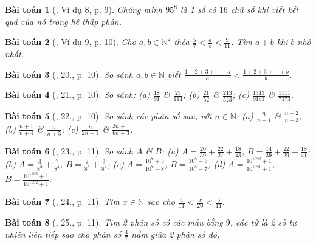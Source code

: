 \documentclass{article}
\newtheorem{baitoan}{Bài toán}
\begin{document}
\begin{baitoan}[\cite{Binh_Toan_6_tap_2}, Ví dụ 8, p. 9]
	Chứng minh $95^8$ là 1 số có $16$ chữ số khi viết kết quả của nó trong hệ thập phân.
\end{baitoan}

\begin{baitoan}[\cite{Binh_Toan_6_tap_2}, Ví dụ 9, p. 10]
	Cho $a,b\in\mathbb{N}^\star$ thỏa $\frac{5}{7} < \frac{a}{b} < \frac{9}{11}$. Tìm $a + b$ khi $b$ nhỏ nhất.
\end{baitoan}

\begin{baitoan}[\cite{Binh_Toan_6_tap_2}, 20., p. 10]
	So sánh $a,b\in\mathbb{N}$ biết $\frac{1 + 2 + 3 + \cdots + a}{a} < \frac{1 + 2 + 3 + \cdots + b}{b}$.
\end{baitoan}

\begin{baitoan}[\cite{Binh_Toan_6_tap_2}, 21., p. 10]
	So sánh: (a) $\frac{18}{91}$ \& $\frac{23}{114}$; (b) $\frac{21}{52}$ \& $\frac{213}{523}$; (c) $\frac{1313}{9191}$ \& $\frac{1111}{7373}$.
\end{baitoan}

\begin{baitoan}[\cite{Binh_Toan_6_tap_2}, 22., p. 10]
	So sánh các phân số sau, với $n\in\mathbb{N}$: (a) $\frac{n}{n + 1}$ \& $\frac{n + 2}{n + 3}$; (b) $\frac{n + 1}{n + 4}$ \& $\frac{n}{n + 5}$; (c) $\frac{n}{2n + 1}$ \& $\frac{3n + 1}{6n + 3}$.
\end{baitoan}

\begin{baitoan}[\cite{Binh_Toan_6_tap_2}, 23., p. 11]
	So sánh $A$ \& $B$: (a) $A = \frac{20}{39} + \frac{22}{27} + \frac{18}{43}$, $B = \frac{14}{39} + \frac{22}{29} + \frac{18}{41}$; (b) $A = \frac{3}{8^3} + \frac{7}{8^4}$, $B = \frac{7}{8^3} + \frac{3}{8^4}$; (c) $A = \frac{10^7 + 5}{10^7 - 8}$, $B = \frac{10^8 + 6}{10^8 - 7}$; (d) $A = \frac{10^{1992} + 1}{10^{1991} + 1}$, $B = \frac{10^{1993} + 1}{10^{1992} + 1}$.
\end{baitoan}

\begin{baitoan}[\cite{Binh_Toan_6_tap_2}, 24., p. 11]
	Tìm $x\in\mathbb{N}$ sao cho $\frac{4}{11} < \frac{x}{20} < \frac{5}{11}$.
\end{baitoan}

\begin{baitoan}[\cite{Binh_Toan_6_tap_2}, 25., p. 11]
	Tìm 2 phân số có các mẫu bằng $9$, các tử là 2 số tự nhiên liên tiếp sao cho phân số $\frac{4}{7}$ nằm giữa 2 phân số đó.
\end{baitoan}
\end{document}
